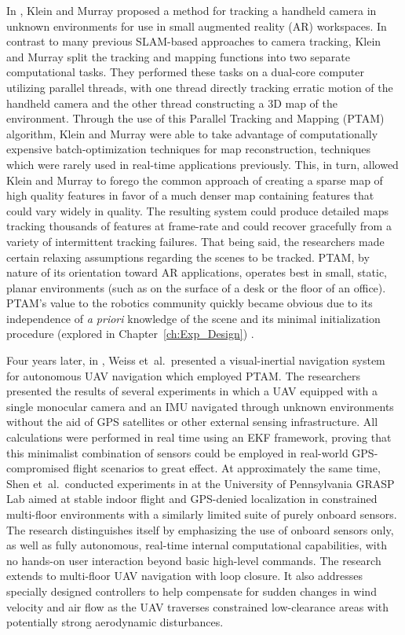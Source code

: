 In \cite{Klein2007}, Klein and Murray proposed a method for tracking a handheld camera in unknown environments for use in small augmented reality (AR) workspaces. In contrast to many previous SLAM-based approaches to camera tracking, Klein and Murray split the tracking and mapping functions into two separate computational tasks. They performed these tasks on a dual-core computer utilizing parallel threads, with one thread directly tracking erratic motion of the handheld camera and the other thread constructing a 3D map of the environment. Through the use of this Parallel Tracking and Mapping (PTAM) algorithm, Klein and Murray were able to take advantage of computationally expensive batch-optimization techniques for map reconstruction, techniques which were rarely used in real-time applications previously. This, in turn, allowed Klein and Murray to forego the common approach of creating a sparse map of high quality features in favor of a much denser map containing features that could vary widely in quality. The resulting system could produce detailed maps tracking thousands of features at frame-rate and could recover gracefully from a variety of intermittent tracking failures. That being said, the researchers made certain relaxing assumptions regarding the scenes to be tracked. PTAM, by nature of its orientation toward AR applications, operates best in small, static, planar environments (such as on the surface of a desk or the floor of an office). PTAM's value to the robotics community quickly became obvious due to its independence of \textit{a priori} knowledge of the scene and its minimal initialization procedure (explored in Chapter~\ref{ch:Exp_Design}) . 

Four years later, in \cite{Weiss2011}, Weiss et~al.\ presented a visual-inertial navigation system for autonomous UAV navigation which employed PTAM. The researchers presented the results of several experiments in which a UAV equipped with a single monocular camera and an IMU navigated through unknown environments without the aid of GPS satellites or other external sensing infrastructure. All calculations were performed in real time using an EKF framework, proving that this minimalist combination of sensors could be employed in real-world GPS-compromised flight scenarios to great effect. At approximately the same time, Shen et~al.\ conducted experiments in \cite{Shen2011} at the University of Pennsylvania GRASP Lab aimed at stable indoor flight and GPS-denied localization in constrained multi-floor environments with a similarly limited suite of purely onboard sensors. The research distinguishes itself by emphasizing the use of onboard sensors only, as well as fully autonomous, real-time internal computational capabilities, with no hands-on user interaction beyond basic high-level commands. The research extends to multi-floor UAV navigation with loop closure. It also addresses specially designed controllers to help compensate for sudden changes in wind velocity and air flow as the UAV traverses constrained low-clearance areas with potentially strong aerodynamic disturbances.


